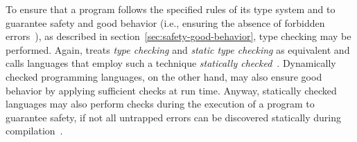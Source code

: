 To ensure that a program follows the specified rules of its type system and to guarantee safety and good behavior (i.e., ensuring the absence of forbidden errors~\cite[p.~37]{TypeSystems:Cardelli:2004}), as described in section~\ref{sec:safety-good-behavior}, type checking may be performed. Again, \citeauthor{TypeSystems:Cardelli:2004} treats \emph{type checking} and \emph{static type checking} as equivalent and calls languages that employ such a technique \emph{statically checked}~\cite[p.~3]{TypeSystems:Cardelli:2004}. Dynamically checked programming languages, on the other hand, may also ensure good behavior by applying sufficient checks at run time. Anyway, statically checked languages may also perform checks during the execution of a program to guarantee safety, if not all untrapped errors can be discovered statically during compilation~\cite[p.~4]{TypeSystems:Cardelli:2004}.

%








